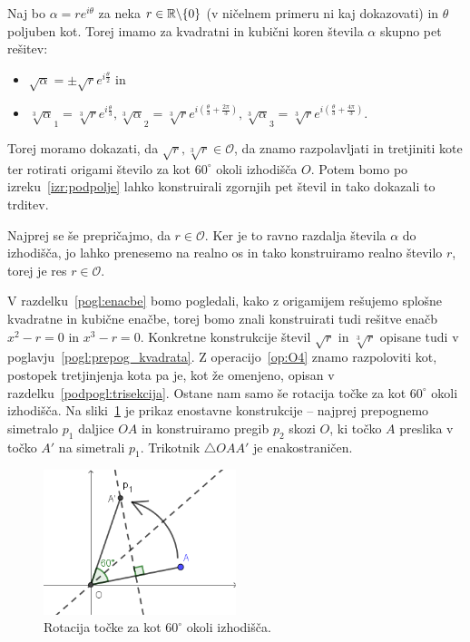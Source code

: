 \begin{dokaz}
    Naj bo $\alpha = r e^{i \theta}$ za neka $r \in \mathbb R \backslash \{0\}$ (v ničelnem primeru ni kaj dokazovati) in $\theta$ poljuben kot. Torej imamo za kvadratni in kubični koren števila $\alpha$ skupno pet rešitev:
    \begin{itemize}
        \item $\sqrt{\alpha} = \pm \sqrt{r}e^{i \frac{\theta}{2}}$ in
        \item $\sqrt[3]{\alpha}_1 = \sqrt[3]{r}e^{i \frac{\theta}{3}}, \sqrt[3]{\alpha}_2 = \sqrt[3]{r}e^{i \left(\frac{\theta}{3} + \frac{2\pi}{3}\right)}, \sqrt[3]{\alpha}_3 = \sqrt[3]{r}e^{i \left(\frac{\theta}{3} + \frac{4\pi}{3}\right)}$.
    \end{itemize}
    Torej moramo dokazati, da $\sqrt{r}, \sqrt[3]{r} \in \mathcal{O}$, da znamo razpolavljati in tretjiniti kote ter rotirati origami število za kot $60^\circ$ okoli izhodišča $O$. Potem bomo po izreku~\ref{izr:podpolje} lahko konstruirali zgornjih pet števil in tako dokazali to trditev.

    Najprej se še prepričajmo, da $r \in \mathcal{O}$. Ker je to ravno razdalja števila $\alpha$ do izhodišča, jo lahko prenesemo na realno os in tako konstruiramo realno število $r$, torej je res $r \in \mathcal{O}$.
    
    V razdelku~\ref{pogl:enacbe} bomo pogledali, kako z origamijem rešujemo splošne kvadratne in kubične enačbe, torej bomo znali konstruirati tudi rešitve enačb $x^2 - r = 0$ in $x^3 - r = 0$. Konkretne konstrukcije števil $\sqrt{r}$ in $\sqrt[3]{r}$ opisane tudi v poglavju~\ref{pogl:prepog_kvadrata}. Z operacijo~\ref{op:O4} znamo razpoloviti kot, postopek tretjinjenja kota pa je, kot že omenjeno, opisan v razdelku~\ref{podpogl:trisekcija}. Ostane nam samo še rotacija točke za kot $60^\circ$ okoli izhodišča. Na sliki~\ref{fig:kot60_rotacija} je prikaz enostavne konstrukcije -- najprej prepognemo simetralo $p_1$ daljice $OA$ in konstruiramo pregib $p_2$ skozi $O$, ki točko $A$ preslika v točko $A'$ na simetrali $p_1$. Trikotnik $\triangle OAA'$ je enakostraničen. 
    \begin{figure}[h]
        \centering
        \includegraphics[width=0.5\textwidth]{images/algebra/kot60.png}
        \caption[Rotacija točke okoli izhodišča]{Rotacija točke za kot $60^\circ$ okoli izhodišča.}
        \label{fig:kot60_rotacija}
    \end{figure}
\end{dokaz}

